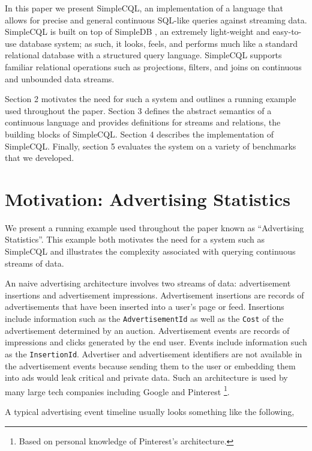 \documentclass[a4paper, 10pt, conference]{IEEEconf}
\begin{document}
In this paper we present SimpleCQL, an implementation of a language that allows for precise and general continuous SQL-like queries against streaming data.  SimpleCQL is built on top of SimpleDB \cite{simpledb}, an extremely light-weight and easy-to-use database system; as such, it looks, feels, and performs much like a standard relational database with a structured query language. SimpleCQL supports  familiar relational operations such as projections, filters, and joins on continuous and unbounded data streams.

Section 2 motivates the need for such a system and outlines a running example used throughout the paper.  Section 3 defines the abstract semantics of a continuous language and provides definitions for streams and relations, the building blocks of SimpleCQL.  Section 4 describes the implementation of SimpleCQL.  Finally, section 5 evaluates the system on a variety of benchmarks that we developed.


\section{Motivation: Advertising Statistics}
We present a running example used throughout the paper known as ``Advertising Statistics''.  This example both motivates the need for a system such as SimpleCQL and illustrates the complexity associated with querying continuous streams of data.

An naive advertising architecture involves two streams of data: advertisement insertions and advertisement impressions. Advertisement insertions are records of advertisements that have been inserted into a user's page or feed.  Insertions include information such as the \texttt{AdvertisementId} as well as the \texttt{Cost} of the advertisement determined by an auction.  Advertisement events are records of impressions and clicks generated by the end user.  Events include information such as the \texttt{InsertionId}.  Advertiser and advertisement identifiers are not available in the advertisement events because sending them to the user or embedding them into ads would leak critical and private data. Such an architecture is used by many large tech companies including Google \cite{photon} and Pinterest \footnote{Based on personal knowledge of Pinterest's architecture.}. 


A typical advertising event timeline usually looks something like the following,
\end{document}
